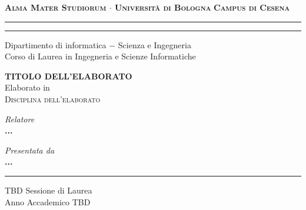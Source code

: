 \begin{titlepage}
    \begin{center}
        {\Large
            \textbf{
                \textsc{Alma Mater Studiorum $\cdot$ Università di Bologna}
            }
        }
        {\large
            \textbf{
                \textsc{Campus di Cesena}
            }
        }
        \rule[0.1cm]{16cm}{0.3mm}
        \rule[0.5cm]{16cm}{0.7mm}
        {\Large
            Dipartimento di informatica $-$ Scienza e Ingegneria \\
        }
        \vspace*{4mm}
        {\Large 
            Corso di Laurea in Ingegneria e Scienze Informatiche
        }
        \vspace*{40mm} %
        \begin{center}
            {\LARGE
                \textbf{
                    TITOLO DELL'ELABORATO \\
                }
            }
            \vspace*{20mm} %
            {\Large
                Elaborato in
            } \\
            \vspace*{3mm}
            {\Large
                \textsc{Disciplina dell'elaborato}
            }
        \end{center}
        \vspace*{45mm}
        \begin{minipage}[t]{0.47\textwidth}
            {\large
                \textit{Relatore} \\
                \textbf{
                    ...
                }
            }
        \end{minipage}
        \begin{minipage}[t]{0.47\textwidth}\raggedleft
            {\large
                \textit{Presentata da} \\
                \textbf{...}
            }
        \end{minipage}
    \end{center}
    \begin{center}
        \vspace*{30mm}
        \rule[0.1cm]{16cm}{0.3mm}
    \end{center}
    \begin{center}
        {\large
            TBD Sessione di Laurea
        } \\
        \vspace*{2mm}
        {\large
            Anno Accademico TBD
        }
    \end{center}
\end{titlepage}
\restoregeometry